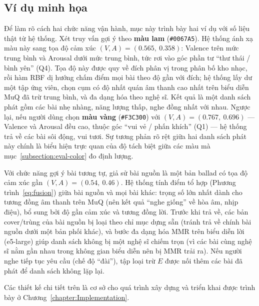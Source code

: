 \documentclass[../DoAn.tex]{subfiles}
\begin{document}
\subsection{Ví dụ minh họa}
\label{subsection:4.2.4}
Để làm rõ cách hai chức năng vận hành, mục này trình bày hai ví dụ với số liệu thật từ hệ thống. Xét truy vấn gợi ý theo \textbf{màu lam} (\texttt{\#0067A5}). Hệ thống ánh xạ màu này sang tọa độ cảm xúc $(V, A) = (0.565,\ 0.358)$: Valence trên mức trung bình và Arousal dưới mức trung bình, tức rơi vào góc phần tư ``thư thái / bình yên'' (Q4). Tọa độ này được quy về đích phân vị trong phân bố kho nhạc, rồi hàm RBF dị hướng chấm điểm mọi bài theo độ gần với đích; hệ thống lấy dư một tập ứng viên, chọn cụm có độ nhất quán âm thanh cao nhất trên biểu diễn MuQ đã trừ trung bình, và đa dạng hóa theo nghệ sĩ. Kết quả là một danh sách phát gồm các bài nhẹ nhàng, năng lượng thấp, nghe đồng nhất với nhau. Ngược lại, nếu người dùng chọn \textbf{màu vàng} (\texttt{\#F3C300}) với $(V, A) = (0.767,\ 0.696)$ --- Valence và Arousal đều cao, thuộc góc ``vui vẻ / phấn khích'' (Q1) --- hệ thống trả về các bài sôi động, vui tươi. Sự tương phản rõ rệt giữa hai danh sách phát này chính là biểu hiện trực quan của độ tách biệt giữa các màu mà mục~\ref{subsection:eval-color} đo định lượng.

Với chức năng gợi ý bài tương tự, giả sử bài nguồn là một bản ballad có tọa độ cảm xúc gần $(V, A) = (0.54,\ 0.46)$. Hệ thống tính điểm tổ hợp (Phương trình~\eqref{eq:fusion}) giữa bài nguồn và mọi bài khác: trọng số lớn nhất dành cho tương đồng âm thanh trên MuQ (nên kết quả ``nghe giống'' về hòa âm, nhịp điệu), bổ sung bởi độ gần cảm xúc và tương đồng lời. Trước khi trả về, các bản cover/trùng của bài nguồn bị loại theo chỉ mục dựng sẵn (tránh trả về chính bài nguồn dưới một bản phối khác), và bước đa dạng hóa MMR trên biểu diễn lời (e5-large) giúp danh sách không bị một nghệ sĩ chiếm trọn (vì các bài cùng nghệ sĩ nằm gần nhau trong không gian biểu diễn nên bị MMR trải ra). Nếu người nghe tiếp tục yêu cầu (chế độ ``đài''), tập loại trừ $E$ được nối thêm các bài đã phát để danh sách không lặp lại.

Các thiết kế chi tiết trên là cơ sở cho quá trình xây dựng và triển khai được trình bày ở Chương~\ref{chapter:Implementation}.
\end{document}
